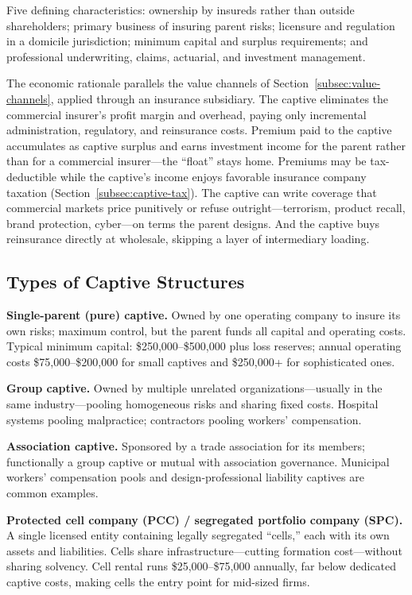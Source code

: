 \documentclass[11pt,openany]{book}
\begin{document}
Five defining characteristics: ownership by insureds rather than outside
shareholders; primary business of insuring parent risks; licensure and
regulation in a domicile jurisdiction; minimum capital and surplus
requirements; and professional underwriting, claims, actuarial, and
investment management.

The economic rationale parallels the value channels of
Section~\ref{subsec:value-channels}, applied through an insurance subsidiary.
The captive eliminates the commercial insurer's profit margin and overhead,
paying only incremental administration, regulatory, and reinsurance costs.
Premium paid to the captive accumulates as captive surplus and earns
investment income for the parent rather than for a commercial insurer---the
``float'' stays home. Premiums may be tax-deductible while the captive's
income enjoys favorable insurance company taxation
(Section~\ref{subsec:captive-tax}). The captive can write coverage that
commercial markets price punitively or refuse outright---terrorism, product
recall, brand protection, cyber---on terms the parent designs. And the
captive buys reinsurance directly at wholesale, skipping a layer of
intermediary loading.

\subsection{Types of Captive Structures}

\textbf{Single-parent (pure) captive.} Owned by one operating company to
insure its own risks; maximum control, but the parent funds all capital and
operating costs. Typical minimum capital: \$250,000--\$500,000 plus loss
reserves; annual operating costs \$75,000--\$200,000 for small captives and
\$250,000+ for sophisticated ones.

\textbf{Group captive.} Owned by multiple unrelated organizations---usually
in the same industry---pooling homogeneous risks and sharing fixed costs.
Hospital systems pooling malpractice; contractors pooling workers'
compensation.

\textbf{Association captive.} Sponsored by a trade association for its
members; functionally a group captive or mutual with association governance.
Municipal workers' compensation pools and design-professional liability
captives are common examples.

\textbf{Protected cell company (PCC) / segregated portfolio company (SPC).} A
single licensed entity containing legally segregated ``cells,'' each with its
own assets and liabilities. Cells share infrastructure---cutting formation
cost---without sharing solvency. Cell rental runs \$25,000--\$75,000
annually, far below dedicated captive costs, making cells the entry point for
mid-sized firms.
\end{document}
